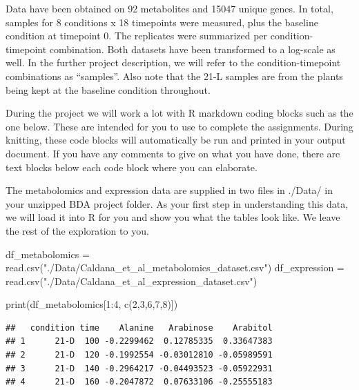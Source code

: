 \documentclass[
]{article}
\newenvironment{Shaded}{\begin{snugshade}}{\end{snugshade}}
\newcommand{\DecValTok}[1]{\textcolor[rgb]{0.00,0.00,0.81}{#1}}
\newcommand{\FunctionTok}[1]{\textcolor[rgb]{0.00,0.00,0.00}{#1}}
\newcommand{\NormalTok}[1]{#1}
\newcommand{\OtherTok}[1]{\textcolor[rgb]{0.56,0.35,0.01}{#1}}
\newcommand{\SpecialCharTok}[1]{\textcolor[rgb]{0.00,0.00,0.00}{#1}}
\newcommand{\StringTok}[1]{\textcolor[rgb]{0.31,0.60,0.02}{#1}}
\begin{document}
Data have been obtained on 92 metabolites and 15047 unique genes. In
total, samples for 8 conditions x 18 timepoints were measured, plus the
baseline condition at timepoint 0. The replicates were summarized per
condition-timepoint combination. Both datasets have been transformed to
a log-scale as well. In the further project description, we will refer
to the condition-timepoint combinations as ``samples''. Also note that
the 21-L samples are from the plants being kept at the baseline
condition throughout.

During the project we will work a lot with R markdown coding blocks such
as the one below. These are intended for you to use to complete the
assignments. During knitting, these code blocks will automatically be
run and printed in your output document. If you have any comments to
give on what you have done, there are text blocks below each code block
where you can elaborate.

The metabolomics and expression data are supplied in two files in
./Data/ in your unzipped BDA project folder. As your first step in
understanding this data, we will load it into R for you and show you
what the tables look like. We leave the rest of the exploration to you.

\begin{Shaded}
\begin{Highlighting}[]
\NormalTok{df\_metabolomics }\OtherTok{=} \FunctionTok{read.csv}\NormalTok{(}\StringTok{"./Data/Caldana\_et\_al\_metabolomics\_dataset.csv"}\NormalTok{)}
\NormalTok{df\_expression }\OtherTok{=} \FunctionTok{read.csv}\NormalTok{(}\StringTok{"./Data/Caldana\_et\_al\_expression\_dataset.csv"}\NormalTok{)}
\end{Highlighting}
\end{Shaded}

\begin{Shaded}
\begin{Highlighting}[]
\FunctionTok{print}\NormalTok{(df\_metabolomics[}\DecValTok{1}\SpecialCharTok{:}\DecValTok{4}\NormalTok{, }\FunctionTok{c}\NormalTok{(}\DecValTok{2}\NormalTok{,}\DecValTok{3}\NormalTok{,}\DecValTok{6}\NormalTok{,}\DecValTok{7}\NormalTok{,}\DecValTok{8}\NormalTok{)])}
\end{Highlighting}
\end{Shaded}

\begin{verbatim}
##   condition time    Alanine   Arabinose    Arabitol
## 1      21-D  100 -0.2299462  0.12785335  0.33647383
## 2      21-D  120 -0.1992554 -0.03012810 -0.05989591
## 3      21-D  140 -0.2964217 -0.04493523 -0.05922931
## 4      21-D  160 -0.2047872  0.07633106 -0.25555183
\end{verbatim}
\end{document}
